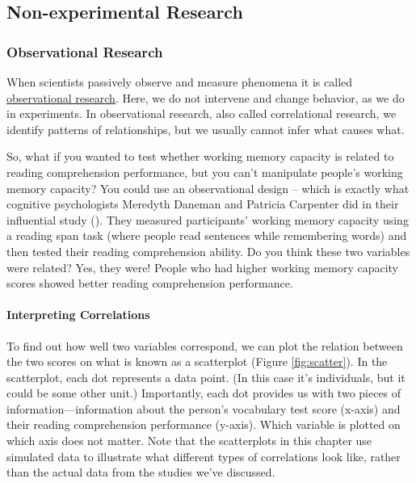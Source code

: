 \documentclass[
]{krantz}
\begin{document}
\subsection*{Non-experimental Research}\label{non-experimental-research}


\subsubsection*{Observational Research}\label{observational-research}


When scientists passively observe and measure phenomena it is called \hyperref[observational-research]{observational research}. Here, we do not intervene and change behavior, as we do in experiments. In observational research, also called correlational research, we identify patterns of relationships, but we usually cannot infer what causes what.

So, what if you wanted to test whether working memory capacity is related to reading comprehension performance, but you can't manipulate people's working memory capacity? You could use an observational design -- which is exactly what cognitive psychologists Meredyth Daneman and Patricia Carpenter did in their influential study (). They measured participants' working memory capacity using a reading span task (where people read sentences while remembering words) and then tested their reading comprehension ability. Do you think these two variables were related? Yes, they were! People who had higher working memory capacity scores showed better reading comprehension performance.

\paragraph*{Interpreting Correlations}\label{interpreting-correlations}

To find out how well two variables correspond, we can plot the relation between the two scores on what is known as a scatterplot (Figure \ref{fig:scatter}). In the scatterplot, each dot represents a data point. (In this case it's individuals, but it could be some other unit.) Importantly, each dot provides us with two pieces of information---information about the person's vocabulary test score (x-axis) and their reading comprehension performance (y-axis). Which variable is plotted on which axis does not matter. Note that the scatterplots in this chapter use simulated data to illustrate what different types of correlations look like, rather than the actual data from the studies we've discussed.
\end{document}
